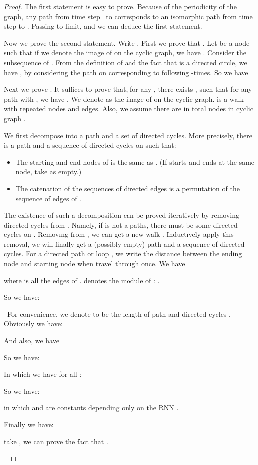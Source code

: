 \begin{proof}
  The first statement is easy to prove. Because of the periodicity of the graph,
  any path from time step \  to  corresponds to an isomorphic
  path from time step  to . Passing to limit, and we can
  deduce the first statement.
  
   Now we prove the second statement. Write .
  First we prove that .
  Let  be a node such that if we
  denote  the image of  on the
  cyclic graph, we have . Consider the
  subsequence  of
  . From the definition of  and the fact that
   is a directed circle, we have , by considering the path
  on  corresponding to following  
  -times. So we have
  
  Next we prove . It
  suffices to prove that, for any , there exists ,
  such that for any path  with , we have . We denote 
  as the image of  on the cyclic graph.  is a walk with
  repeated nodes and edges. Also, we assume there are in total  nodes
  in cyclic graph .
  
  We first decompose  into a path and a set of directed
  cycles. More precisely, there is a path  and a sequence of
  directed cycles  on
   such that:
  \begin{itemize}
    \item The starting and end nodes of  is the same as .
    (If  starts and ends at the same node, take  as empty.)
    
    \item The catenation of the sequences of directed edges  is a
    permutation of the sequence of edges of .
  \end{itemize}
  The existence of such a decomposition can be proved iteratively by removing
  directed cycles from . Namely, if  is not a paths, there
  must be some directed cycles  on . Removing  from
  , we can get a new walk . Inductively apply this removal,
  we will finally get a (possibly empty) path and a sequence of directed
  cycles. For a directed path or loop , we write  the
  distance between the ending node and starting node when travel through
   once. We have
  
  where  is all the edges of
  .  denotes the module of : .
  
  So we have:
  
  \ For convenience, we denote  to be the length of
  path  and directed cycles . Obviously we have:
  
  And also, we have
  
  So we have:
  
  In which we have for all  :
  
  So we have:
  
  in which  and  are constants depending only on the RNN
  .
  
  Finally we have:
  
  take , we can prove the fact that .
  
  \ 
\end{proof}

